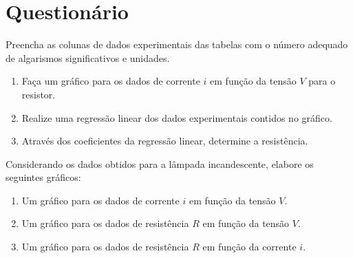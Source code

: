 \begin{fullwidth}
\noindent{}
\vspace{5mm}

\noindent{}

\noindent{}

\noindent{}

\noindent{}

\noindent{}
\end{fullwidth}

\vspace{5mm}

\section{Questionário}

\begin{question}[type={exam}]{2}
Preencha as colunas de dados experimentais das tabelas com o número adequado de algarismos significativos e unidades.
\end{question}

\begin{question}[type={exam}]{3}
\begin{enumerate}[label=\roman*.]
\item Faça um gráfico para os dados de corrente $i$ em função da tensão $V$ para o resistor.
\item Realize uma regressão linear dos dados experimentais contidos no gráfico.
\item Através dos coeficientes da regressão linear, determine a resistência.
\end{enumerate}
\end{question}

\begin{question}[type={exam}]{3}
Considerando os dados obtidos para a lâmpada incandescente, elabore os seguintes gráficos:
\begin{enumerate}[label=\roman*.]
\item Um gráfico para os dados de corrente $i$ em função da tensão $V$.
\item Um gráfico para os dados de resistência $R$ em função da tensão $V$.
\item Um gráfico para os dados de resistência $R$ em função da corrente $i$.
\end{enumerate}
\end{question}

